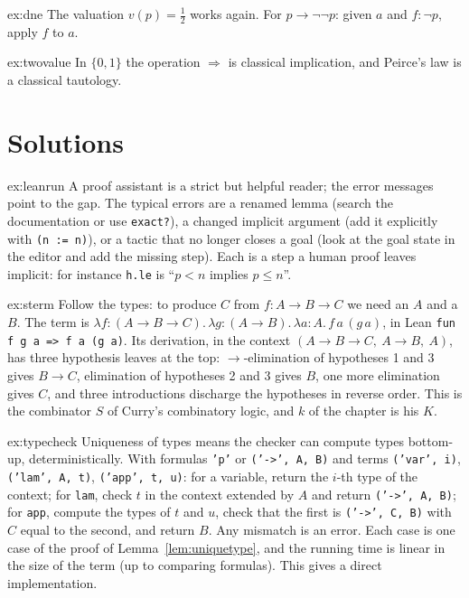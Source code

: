 \begin{hint}{ex:dne}
The valuation $v(p)=\frac12$ works again. For $p\to\neg\neg p$: given $a$ and $f:\neg p$, apply $f$ to $a$.
\end{hint}

\begin{hint}{ex:twovalue}
In $\{0,1\}$ the operation $\Rightarrow$ is classical implication, and Peirce's law is a classical tautology.
\end{hint}

\section{Solutions}

\begin{solution}{ex:leanrun}
\idea A proof assistant is a strict but helpful reader; the error messages point to the gap.
\writeup The typical errors are a renamed lemma (search the documentation or use \texttt{exact?}), a changed implicit argument (add it explicitly with \texttt{(n := n)}), or a tactic that no longer closes a goal
(look at the goal state in the editor and add the missing step). Each is a step a human proof leaves implicit: for instance \texttt{h.le} is ``$p<n$ implies $p\le n$''.
\end{solution}

\begin{solution}{ex:sterm}
\idea Follow the types: to produce $C$ from $f:A\to B\to C$ we need an $A$ and a $B$.
\writeup The term is $\lambda f{:}(A\to B\to C).\,\lambda g{:}(A\to B).\,\lambda a{:}A.\,f\,a\,(g\,a)$, in Lean \texttt{fun f g a => f a (g a)}. Its derivation, in the context $(A\to B\to C,\ A\to B,\ A)$, has three
hypothesis leaves at the top: $\to$-elimination of hypotheses 1 and 3 gives $B\to C$, elimination of hypotheses 2 and 3 gives $B$, one more elimination gives $C$, and three introductions discharge the hypotheses in
reverse order. This is the combinator $S$ of Curry's combinatory logic, and $k$ of the chapter is his $K$.
\end{solution}

\begin{solution}{ex:typecheck}
\idea Uniqueness of types means the checker can compute types bottom-up, deterministically.
\writeup With formulas \texttt{'p'} or \texttt{('->', A, B)} and terms \texttt{('var', i)}, \texttt{('lam', A, t)}, \texttt{('app', t, u)}: for a variable, return the $i$-th type of the context; for \texttt{lam}, check $t$ in the context
extended by $A$ and return \texttt{('->', A, B)}; for \texttt{app}, compute the types of $t$ and $u$, check that the first is \texttt{('->', C, B)} with $C$ equal to the second, and return $B$. Any mismatch is an error. Each case
is one case of the proof of Lemma~\ref{lem:uniquetype}, and the running time is linear in the size of the term (up to comparing formulas). This gives a direct implementation.
\end{solution}

